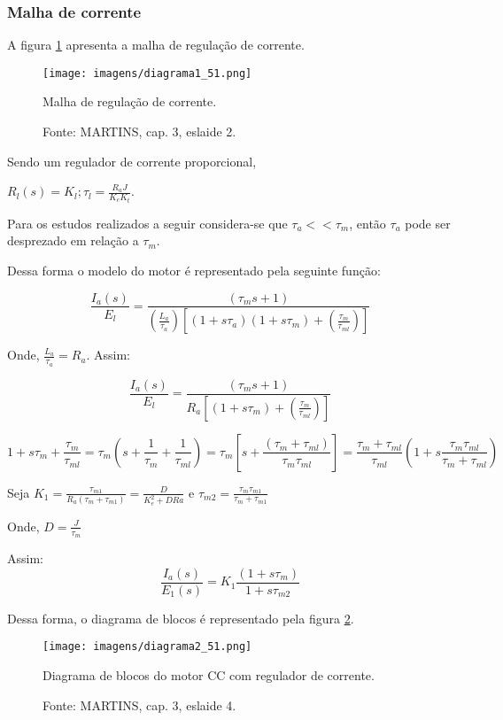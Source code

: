 \subsubsection{Malha de corrente}

A figura \ref{fig:D1_51} apresenta a malha de regulação de corrente.

\begin{figure}[ht!]
\center
\texttt{[image: imagens/diagrama1\_51.png]}
\caption{\label{fig:D1_51} Malha de regulação de corrente.}
\caption*{Fonte: MARTINS, cap. 3, eslaide 2.}
\end{figure}

Sendo um regulador de corrente proporcional,

$R_{l}(s) = K_{l}; \tau_{l} = \frac{R_{a}J}{K_{e}K_{t}}$.

Para os estudos realizados a seguir considera-se que $\tau_{a} << \tau_{m}$, então $\tau_{a}$ pode ser desprezado em relação a $\tau_{m}$.

Dessa forma o modelo do motor é representado pela seguinte função:

\[\frac{I_{a}(s)}{E_{l}} = \frac{\left(\tau_{m}s + 1\right)}{\left(\frac{L_{a}}{\tau_{a}}\right)\left[\left(1 + s\tau_{a}\right)\left(1 + s\tau_{m}\right) + \left(\frac{\tau_{m}}{\tau_{ml}}\right)\right]}\]

Onde, $\frac{L_{a}}{\tau_{a}} = R_{a}$. Assim:

\[\frac{I_{a}(s)}{E_{l}} = \frac{\left(\tau_{m}s + 1\right)}{R_{a}\left[\left(1 + s\tau_{m}\right) + \left(\frac{\tau_{m}}{\tau_{ml}}\right)\right]}\]

\[1 +s\tau_{m} + \frac{\tau_{m}}{\tau_{ml}} = \tau_{m}\left(s + \frac{1}{\tau_{m}} +\frac{1}{\tau_{ml}}\right) = \tau_{m}\left[s + \frac{\left(\tau_{m} + \tau_{ml}\right)}{\tau_{m}\tau_{ml}}\right] = \frac{\tau_{m} + \tau_{ml}}{\tau_{ml}}\left(1 + s\frac{\tau_{m}\tau_{ml}}{\tau_{m} + \tau_{ml}}\right)\]

Seja $K_{1} = \frac{\tau_{m1}}{R_{a}\left(\tau_{m} + \tau_{m1}\right)} = \frac{D}{K_{e}^{2} + DR{a}}$ e $\tau_{m2} = \frac{\tau_{m}\tau_{m1}}{\tau_{m} + \tau_{m1}}$

Onde, $D = \frac{J}{\tau_{m}}$

Assim:
\[\frac{I_{a}(s)}{E_{1}(s)} = K_{1}\frac{\left(1 + s\tau_{m}\right)}{1 + s\tau_{m2}} \]

Dessa forma, o diagrama de blocos é representado pela figura \ref{fig:D2_51}.

\begin{figure}[ht!]
\center
\texttt{[image: imagens/diagrama2\_51.png]}
\caption{\label{fig:D2_51} Diagrama de blocos do motor CC com regulador de corrente.}
\caption*{Fonte: MARTINS, cap. 3, eslaide 4.}
\end{figure}

